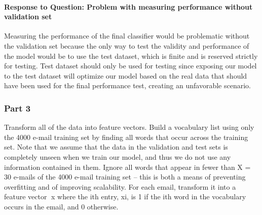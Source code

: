 \documentclass[11pt]{article}
\begin{document}
    \paragraph{Response to Question: Problem with measuring performance
without validation
set}\label{response-to-question-problem-with-measuring-performance-without-validation-set}

Measuring the performance of the final classifier would be problematic
without the validation set because the only way to test the validity and
performance of the model would be to use the test dataset, which is
finite and is reserved strictly for testing. Test dataset should only be
used for testing since exposing our model to the test dataset will
optimize our model based on the real data that should have been used for
the final performance test, creating an unfavorable scenario.

    \subsubsection{Part 3}\label{part-3}

Transform all of the data into feature vectors. Build a vocabulary list
using only the 4000 e-mail training set by finding all words that occur
across the training set. Note that we assume that the data in the
validation and test sets is completely unseen when we train our model,
and thus we do not use any information contained in them. Ignore all
words that appear in fewer than X = 30 e-mails of the 4000 e-mail
training set -- this is both a means of preventing overfitting and of
improving scalability. For each email, transform it into a feature
vector x where the ith entry, xi, is 1 if the ith word in the
vocabulary occurs in the email, and 0 otherwise.
\end{document}
